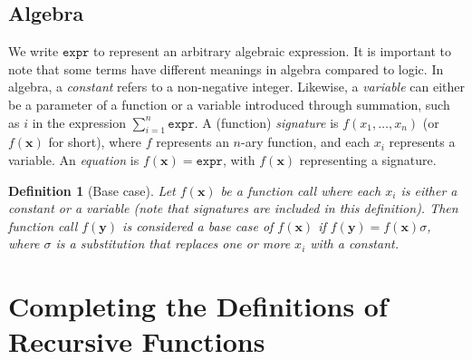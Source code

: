 \documentclass{article}
\newtheorem{definition}{Definition}
\theoremstyle{remark}
\newcommand{\expr}{\mathtt{expr}}
\begin{document}
\subsection{Algebra}\label{sec:algebra}

We write $\expr{}$ to represent an arbitrary algebraic expression. It is
important to note that some terms have different meanings in algebra compared to
logic. In algebra, a \emph{constant} refers to a non-negative integer. Likewise,
a \emph{variable} can either be a parameter of a function or a variable
introduced through summation, such as $i$ in the expression
$\sum_{i=1}^{n} \expr$. A (function) \emph{signature} is
$f(x_{1}, \dots, x_{n})$ (or $f(\mathbf{x})$ for short), where $f$ represents an
$n$-ary function, and each $x_{i}$ represents a variable. An \emph{equation} is
$f(\mathbf{x}) = \expr{}$, with $f(\mathbf{x})$ representing a signature.

\begin{definition}[Base case]\label{def:basecase}
  Let $f(\mathbf{x})$ be a function call where each $x_{i}$ is either a constant
  or a variable (note that signatures are included in this definition). Then
  function call $f(\mathbf{y})$ is considered a \emph{base case} of
  $f(\mathbf{x})$ if $f(\mathbf{y}) = f(\mathbf{x})\sigma$, where $\sigma$ is a
  substitution that replaces one or more $x_{i}$ with a constant.
\end{definition}

\section{Completing the Definitions of Recursive Functions}\label{sec:main}
\end{document}
